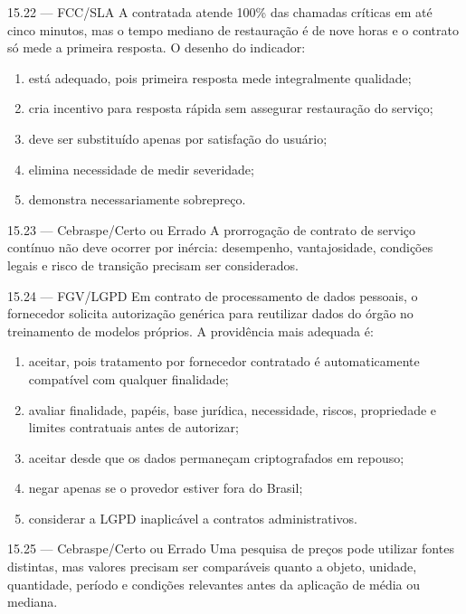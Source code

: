 \begin{questao}{ 15.22 — FCC/SLA}
A contratada atende 100\% das chamadas críticas em até cinco minutos, mas o tempo mediano de restauração é de nove horas e o contrato só mede a primeira resposta. O desenho do indicador:
\begin{enumerate}[label=\Alph*)]
\item está adequado, pois primeira resposta mede integralmente qualidade;
\item cria incentivo para resposta rápida sem assegurar restauração do serviço;
\item deve ser substituído apenas por satisfação do usuário;
\item elimina necessidade de medir severidade;
\item demonstra necessariamente sobrepreço.
\end{enumerate}
\end{questao}

\begin{questao}{ 15.23 — Cebraspe/Certo ou Errado}
A prorrogação de contrato de serviço contínuo não deve ocorrer por inércia: desempenho, vantajosidade, condições legais e risco de transição precisam ser considerados.
\end{questao}

\begin{questao}{ 15.24 — FGV/LGPD}
Em contrato de processamento de dados pessoais, o fornecedor solicita autorização genérica para reutilizar dados do órgão no treinamento de modelos próprios. A providência mais adequada é:
\begin{enumerate}[label=\Alph*)]
\item aceitar, pois tratamento por fornecedor contratado é automaticamente compatível com qualquer finalidade;
\item avaliar finalidade, papéis, base jurídica, necessidade, riscos, propriedade e limites contratuais antes de autorizar;
\item aceitar desde que os dados permaneçam criptografados em repouso;
\item negar apenas se o provedor estiver fora do Brasil;
\item considerar a LGPD inaplicável a contratos administrativos.
\end{enumerate}
\end{questao}

\begin{questao}{ 15.25 — Cebraspe/Certo ou Errado}
Uma pesquisa de preços pode utilizar fontes distintas, mas valores precisam ser comparáveis quanto a objeto, unidade, quantidade, período e condições relevantes antes da aplicação de média ou mediana.
\end{questao}

